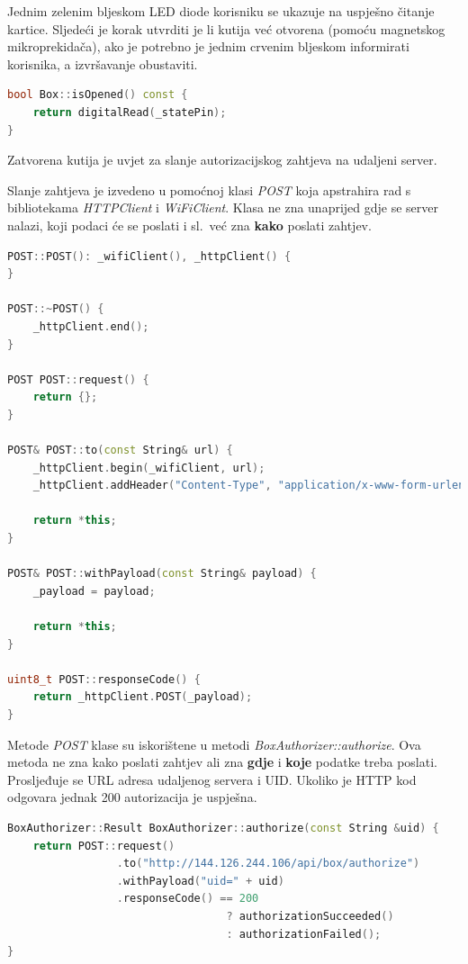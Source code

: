 Jednim zelenim bljeskom LED diode korisniku se ukazuje na uspješno čitanje kartice.
Sljedeći je korak utvrditi je li kutija već otvorena (pomoću magnetskog mikroprekidača), ako je potrebno je jednim
crvenim bljeskom informirati korisnika, a izvršavanje obustaviti.

\begin{lstlisting}[language=C++]
bool Box::isOpened() const {
    return digitalRead(_statePin);
}
\end{lstlisting}

Zatvorena kutija je uvjet za slanje autorizacijskog zahtjeva na udaljeni server.

Slanje zahtjeva je izvedeno u pomoćnoj klasi \textit{POST} koja apstrahira rad s bibliotekama \textit{HTTPClient} i
\textit{WiFiClient}.
Klasa ne zna unaprijed gdje se server nalazi, koji podaci će se poslati i sl.\ već zna \textbf{kako} poslati zahtjev.

\begin{lstlisting}[language=C++]
POST::POST(): _wifiClient(), _httpClient() {
}

POST::~POST() {
    _httpClient.end();
}

POST POST::request() {
    return {};
}

POST& POST::to(const String& url) {
    _httpClient.begin(_wifiClient, url);
    _httpClient.addHeader("Content-Type", "application/x-www-form-urlencoded");

    return *this;
}

POST& POST::withPayload(const String& payload) {
    _payload = payload;

    return *this;
}

uint8_t POST::responseCode() {
    return _httpClient.POST(_payload);
}
\end{lstlisting}

Metode \textit{POST} klase su iskorištene u metodi \textit{BoxAuthorizer::authorize}.
Ova metoda ne zna kako poslati zahtjev ali zna \textbf{gdje} i \textbf{koje} podatke treba poslati.
Prosljeđuje se URL adresa udaljenog servera i UID\@.
Ukoliko je HTTP kod odgovara jednak 200 autorizacija je uspješna.

\begin{lstlisting}[language=C++]
BoxAuthorizer::Result BoxAuthorizer::authorize(const String &uid) {
    return POST::request()
                 .to("http://144.126.244.106/api/box/authorize")
                 .withPayload("uid=" + uid)
                 .responseCode() == 200
                                  ? authorizationSucceeded()
                                  : authorizationFailed();
}
\end{lstlisting}

